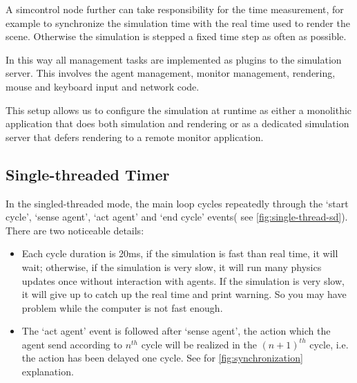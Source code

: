 A simcontrol node further can take responsibility for the time
measurement, for example to synchronize the simulation time with the
real time used to render the scene.  Otherwise the simulation is
stepped a fixed time step as often as possible.

In this way all management tasks are implemented as plugins to the
simulation server. This involves the agent management, monitor
management, rendering, mouse and keyboard input and network code.

This setup allows us to configure the simulation at runtime as either
a monolithic application that does both simulation and rendering or as
a dedicated simulation server that defers rendering to a remote
monitor application.

\subsection{Single-threaded Timer}

In the singled-threaded mode, the main loop cycles repeatedly through
the `start cycle', `sense agent', `act agent' and `end cycle' events(
see \autoref{fig:single-thread-sd}). There are two noticeable details:
\begin{itemize}
\item Each cycle duration is 20ms, if the simulation is fast than real
  time, it will wait; otherwise, if the simulation is very slow, it
  will run many physics updates once without interaction with agents.
  If the simulation is very slow, it will give up to catch up the real
  time and print warning. So you may have problem while the computer
  is not fast enough.
\item The `act agent' event is followed after `sense agent', the
  action which the agent send according to $n^{th}$ cycle will be
  realized in the $(n+1)^{th}$ cycle, i.e. the action has been delayed
  one cycle. See for \autoref{fig:synchronization} explanation.
\end{itemize}


